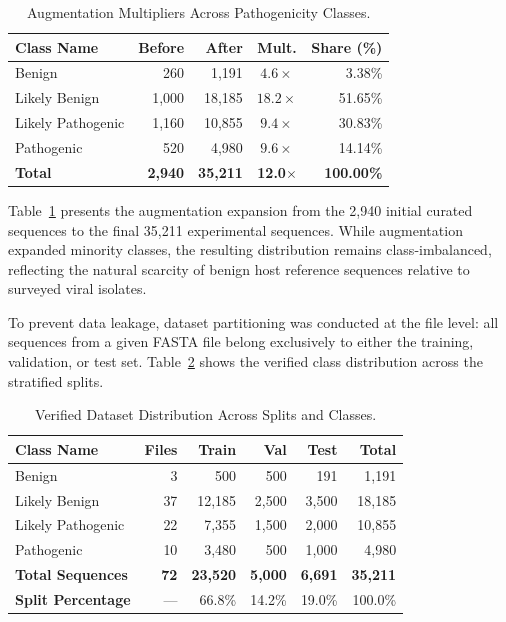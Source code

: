 \documentclass[conference]{IEEEtran}
\begin{document}
\begin{table}[t]
\centering
\caption{Augmentation Multipliers Across Pathogenicity Classes.}
\label{tab:augmentation_summary}
\footnotesize
\begin{tabularx}{\columnwidth}{@{}X r r c r@{}}
\toprule
\textbf{Class Name} & \textbf{Before} & \textbf{After} & \textbf{Mult.} & \textbf{Share (\%)} \\
\midrule
Benign & 260 & 1,191 & $4.6\times$ & 3.38\% \\
Likely Benign & 1,000 & 18,185 & $18.2\times$ & 51.65\% \\
Likely Pathogenic & 1,160 & 10,855 & $9.4\times$ & 30.83\% \\
Pathogenic & 520 & 4,980 & $9.6\times$ & 14.14\% \\
\midrule
\textbf{Total} & \textbf{2,940} & \textbf{35,211} & \textbf{12.0$\times$} & \textbf{100.00\%} \\
\bottomrule
\end{tabularx}
\end{table}

Table~\ref{tab:augmentation_summary} presents the augmentation expansion from the 2,940 initial curated sequences to the final 35,211 experimental sequences. While augmentation expanded minority classes, the resulting distribution remains class-imbalanced, reflecting the natural scarcity of benign host reference sequences relative to surveyed viral isolates.

To prevent data leakage, dataset partitioning was conducted at the file level: all sequences from a given FASTA file belong exclusively to either the training, validation, or test set. Table~\ref{tab:dataset_stats} shows the verified class distribution across the stratified splits.

\begin{table}[t]
\centering
\caption{Verified Dataset Distribution Across Splits and Classes.}
\label{tab:dataset_stats}
\footnotesize
\begin{tabularx}{\columnwidth}{@{}X r r r r r@{}}
\toprule
\textbf{Class Name} & \textbf{Files} & \textbf{Train} & \textbf{Val} & \textbf{Test} & \textbf{Total} \\
\midrule
Benign & 3 & 500 & 500 & 191 & 1,191 \\
Likely Benign & 37 & 12,185 & 2,500 & 3,500 & 18,185 \\
Likely Pathogenic & 22 & 7,355 & 1,500 & 2,000 & 10,855 \\
Pathogenic & 10 & 3,480 & 500 & 1,000 & 4,980 \\
\midrule
\textbf{Total Sequences} & \textbf{72} & \textbf{23,520} & \textbf{5,000} & \textbf{6,691} & \textbf{35,211} \\
\textbf{Split Percentage} & --- & 66.8\% & 14.2\% & 19.0\% & 100.0\% \\
\bottomrule
\end{tabularx}
\end{table}
\end{document}
